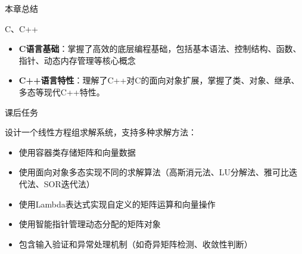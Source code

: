 \documentclass[UTF8,aspectratio=169]{beamer}
\begin{document}
\begin{frame}{本章总结}
    \begin{ytublock}{C、C++}
        \begin{itemize}
            \item \textbf{C语言基础}：掌握了高效的底层编程基础，包括基本语法、控制结构、函数、指针、动态内存管理等核心概念
            \item \textbf{C++语言特性}：理解了C++对C的面向对象扩展，掌握了类、对象、继承、多态等现代C++特性。
        \end{itemize}
    \end{ytublock}
    \begin{ytublock}{课后任务}
        \item 设计一个线性方程组求解系统，支持多种求解方法：
        \begin{itemize}
            \item 使用容器类存储矩阵和向量数据
            \item 使用面向对象多态实现不同的求解算法（高斯消元法、LU分解法、雅可比迭代法、SOR迭代法）
            \item 使用Lambda表达式实现自定义的矩阵运算和向量操作
            \item 使用智能指针管理动态分配的矩阵对象
            \item 包含输入验证和异常处理机制（如奇异矩阵检测、收敛性判断）
        \end{itemize}
    \end{ytublock}
\end{frame}
\end{document}
